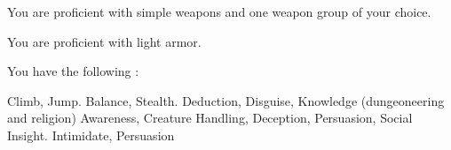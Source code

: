         You are proficient with simple weapons and one weapon group of your choice.

        You are proficient with light armor.

        You have the following :
        \begin{itemize}
             Climb, Jump.
             Balance, Stealth.
             Deduction, Disguise, Knowledge (dungeoneering and religion)
             Awareness, Creature Handling, Deception, Persuasion, Social Insight.
             Intimidate, Persuasion
        \end{itemize}
